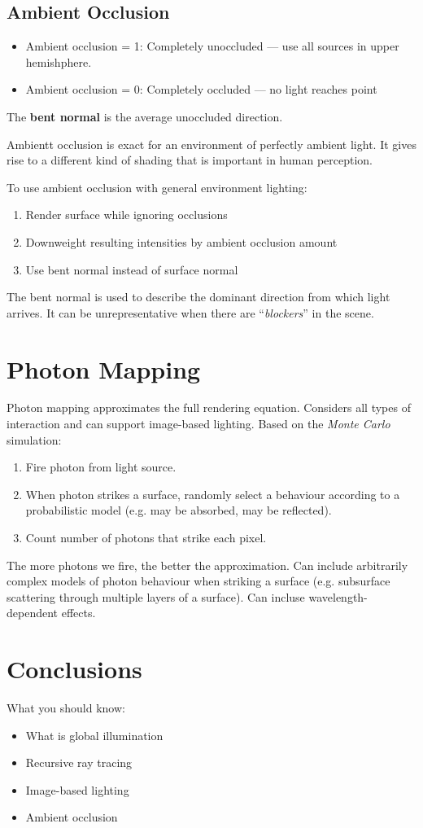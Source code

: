 \documentclass{article}
\begin{document}
\subsection{Ambient Occlusion}
\begin{itemize}
	\item Ambient occlusion = 1: Completely unoccluded --- use all sources in upper hemishphere.
	\item Ambient occlusion = 0: Completely occluded --- no light reaches point
\end{itemize}
The \textbf{bent normal} is the average unoccluded direction.

Ambientt occlusion is exact for an environment of perfectly ambient light.
It gives rise to a different kind of shading that is important in human perception.

To use ambient occlusion with general environment lighting:
\begin{enumerate}
	\item Render surface while ignoring occlusions
	\item Downweight resulting intensities by ambient occlusion amount
	\item Use bent normal instead of surface normal
\end{enumerate}
The bent normal is used to describe the dominant direction from which light arrives.
It can be unrepresentative when there are ``\textit{blockers}'' in the scene.

\section{Photon Mapping}
Photon mapping approximates the full rendering equation.
Considers all types of interaction and can support image-based lighting.
Based on the \textit{Monte Carlo} simulation:
\begin{enumerate}
	\item Fire photon from light source.
	\item When photon strikes a surface, randomly select a behaviour according to a probabilistic model (e.g. may be absorbed, may be reflected).
	\item Count number of photons that strike each pixel.
\end{enumerate}
The more photons we fire, the better the approximation.
Can include arbitrarily complex models of photon behaviour when striking a surface (e.g. subsurface scattering through multiple layers of a surface).
Can incluse wavelength-dependent effects.

\section{Conclusions}
What you should know:
\begin{itemize}
	\item What is global illumination
	\item Recursive ray tracing
	\item Image-based lighting
	\item Ambient occlusion
\end{itemize}
\end{document}
